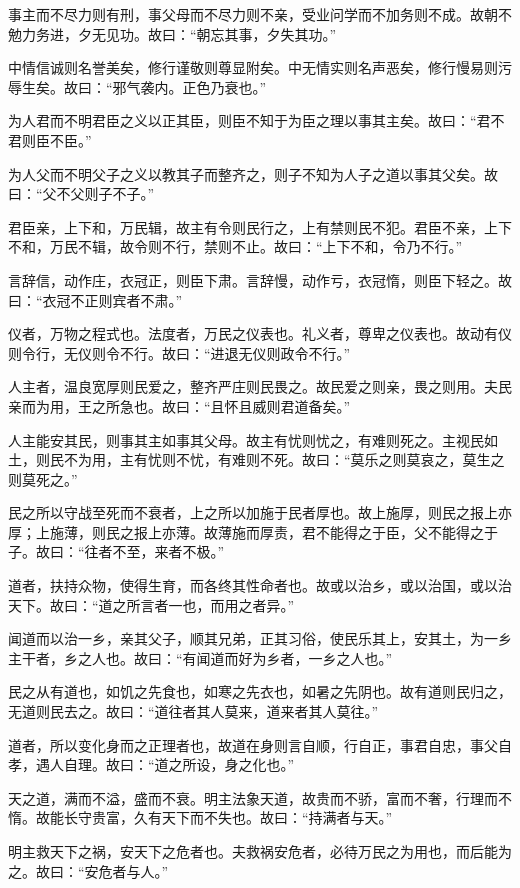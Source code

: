 \documentclass[]{article}
\begin{document}
事主而不尽力则有刑，事父母而不尽力则不亲，受业问学而不加务则不成。故朝不勉力务进，夕无见功。故曰：``朝忘其事，夕失其功。''

中情信诚则名誉美矣，修行谨敬则尊显附矣。中无情实则名声恶矣，修行慢易则污辱生矣。故曰：``邪气袭内。正色乃衰也。''

为人君而不明君臣之义以正其臣，则臣不知于为臣之理以事其主矣。故曰：``君不君则臣不臣。''

为人父而不明父子之义以教其子而整齐之，则子不知为人子之道以事其父矣。故曰：``父不父则子不子。''

君臣亲，上下和，万民辑，故主有令则民行之，上有禁则民不犯。君臣不亲，上下不和，万民不辑，故令则不行，禁则不止。故曰：``上下不和，令乃不行。''

言辞信，动作庄，衣冠正，则臣下肃。言辞慢，动作亏，衣冠惰，则臣下轻之。故曰：``衣冠不正则宾者不肃。''

仪者，万物之程式也。法度者，万民之仪表也。礼义者，尊卑之仪表也。故动有仪则令行，无仪则令不行。故曰：``进退无仪则政令不行。''

人主者，温良宽厚则民爱之，整齐严庄则民畏之。故民爱之则亲，畏之则用。夫民亲而为用，王之所急也。故曰：``且怀且威则君道备矣。''

人主能安其民，则事其主如事其父母。故主有忧则忧之，有难则死之。主视民如土，则民不为用，主有忧则不忧，有难则不死。故曰：``莫乐之则莫哀之，莫生之则莫死之。''

民之所以守战至死而不衰者，上之所以加施于民者厚也。故上施厚，则民之报上亦厚；上施薄，则民之报上亦薄。故薄施而厚责，君不能得之于臣，父不能得之于子。故曰：``往者不至，来者不极。''

道者，扶持众物，使得生育，而各终其性命者也。故或以治乡，或以治国，或以治天下。故曰：``道之所言者一也，而用之者异。''

闻道而以治一乡，亲其父子，顺其兄弟，正其习俗，使民乐其上，安其土，为一乡主干者，乡之人也。故曰：``有闻道而好为乡者，一乡之人也。''

民之从有道也，如饥之先食也，如寒之先衣也，如暑之先阴也。故有道则民归之，无道则民去之。故曰：``道往者其人莫来，道来者其人莫往。''

道者，所以变化身而之正理者也，故道在身则言自顺，行自正，事君自忠，事父自孝，遇人自理。故曰：``道之所设，身之化也。''

天之道，满而不溢，盛而不衰。明主法象天道，故贵而不骄，富而不奢，行理而不惰。故能长守贵富，久有天下而不失也。故曰：``持满者与天。''

明主救天下之祸，安天下之危者也。夫救祸安危者，必待万民之为用也，而后能为之。故曰：``安危者与人。''
\end{document}
